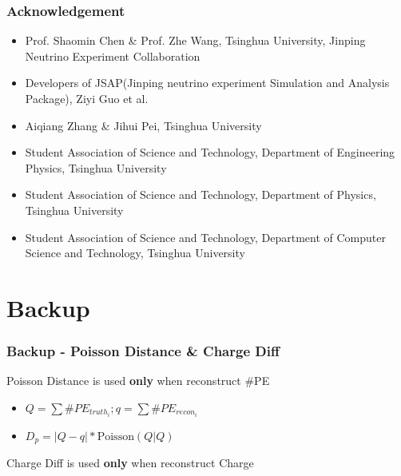 \documentclass{beamer}
\begin{document}
\begin{frame}
\frametitle{Acknowledgement}
\begin{itemize}
    \item Prof. Shaomin Chen \& Prof. Zhe Wang, Tsinghua University, Jinping Neutrino Experiment Collaboration
    \item Developers of JSAP(Jinping neutrino experiment Simulation and Analysis Package), Ziyi Guo et al. 
    \item Aiqiang Zhang \& Jihui Pei, Tsinghua University
    \item Student Association of Science and Technology, Department of Engineering Physics, Tsinghua University
    \item Student Association of Science and Technology, Department of Physics, Tsinghua University
    \item Student Association of Science and Technology, Department of Computer Science and Technology, Tsinghua University
\end{itemize}
\end{frame}

\appendix
\section{Backup}
\begin{frame}[noframenumbering]
\thispagestyle{empty}
\frametitle{Backup - Poisson Distance \& Charge Diff}
\hspace{4mm}Poisson Distance is used \textbf{only} when reconstruct \#PE
\begin{itemize}
    \item $Q = \sum \#PE_{truth_i}; q = \sum \#PE_{recon_i}$
    \item $D_{p} = |Q-q|*\mathrm{Poisson}(Q|Q)$
\end{itemize}
\hspace{4mm}Charge Diff is used \textbf{only} when reconstruct Charge
\end{frame}
\end{document}
